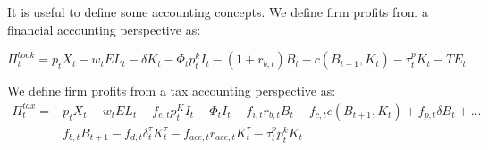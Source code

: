It is useful to define some accounting concepts.  We define firm profits from a financial accounting perspective as:

\begin{equation}
\label{eqn:profit_book}
\Pi^{book}_{t} = p_{t}X_{t}-w_{t}EL_{t}-\delta K_{t} -\Phi_{t}p^{k}_{t}I_{t}-(1+r_{b,t})B_{t}- c(B_{t+1},K_{t})-\tau^{p}_{t}K_{t}-TE_{t}
\end{equation}

We define firm profits from a tax accounting perspective as:
\begin{equation}
\label{eqn:profit_tax}
\begin{split}
\Pi^{tax}_{t}= & p_{t}X_{t}-w_{t}EL_{t}-f_{e,t}p^{K}_{t}I_{t}-\Phi_{t}I_{t}-f_{i,t}r_{b,t}B_{t}-f_{c,t}c(B_{t+1},K_{t})+f_{p,t}\delta B_{t}+...\\
& f_{b,t}B_{t+1}-f_{d,t}\delta^{\tau}_{t}K^{\tau}_{t}-f_{ace,t}r_{ace,t}K^{\tau}_{t}-\tau^{p}_{t}p^{k}_{t}K_{t}
\end{split}
\end{equation}

